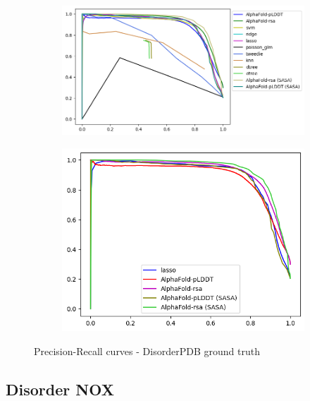 \begin{figure}[h!]
    \begin{subfigure}{1.1\linewidth}
        \includegraphics[width=\linewidth]{res/ML/precisionrecall-disorderpdb-total.png}
    \end{subfigure}
    
    \begin{subfigure}{0.8\linewidth}
        \includegraphics[width=\linewidth]{res/ML/precisionrecall-disorderpdb.png}
    \end{subfigure}
    \caption{Precision-Recall curves - DisorderPDB ground truth}
\end{figure}

\pagebreak

\subsection{Disorder NOX}

